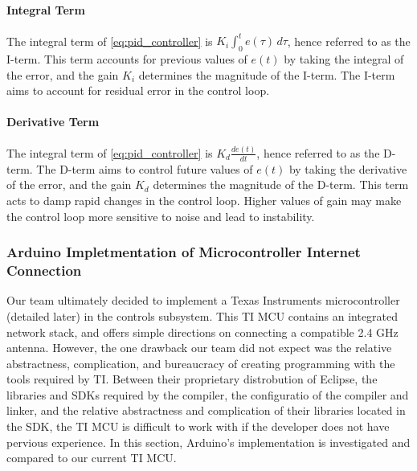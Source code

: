 \paragraph{Integral Term} The integral term of \autoref{eq:pid_controller} is $K_i\int_{0}^{t}e(\tau) \, d\tau$, hence referred to as the I-term. This term accounts for previous values of $e(t)$ by taking the integral of the error, and the gain $K_i$ determines the magnitude of the I-term. The I-term aims to account for residual error in the control loop.

\paragraph{Derivative Term} The integral term of \autoref{eq:pid_controller} is $K_d\frac{de(t)}{dt}$, hence referred to as the D-term. The D-term aims to control future values of $e(t)$ by taking the derivative of the error, and the gain $K_d$ determines the magnitude of the D-term. This term acts to damp rapid changes in the control loop. Higher values of gain may make the control loop more sensitive to noise and lead to instability.

\subsubsection{Arduino Impletmentation of Microcontroller Internet Connection} Our team ultimately decided to implement a Texas Instruments microcontroller (detailed later) in the controls subsystem. This TI MCU contains an integrated network stack, and offers simple directions on connecting a compatible 2.4 GHz antenna. However, the one drawback our team did not expect was the relative abstractness, complication, and bureaucracy of creating programming with the tools required by TI. Between their proprietary distrobution of Eclipse, the libraries and SDKs required by the compiler, the configuratio of the compiler and linker, and the relative abstractness and complication of their libraries located in the SDK, the TI MCU is difficult to work with if the developer does not have pervious experience. In this section, Arduino's implementation is investigated and compared to our current TI MCU.

